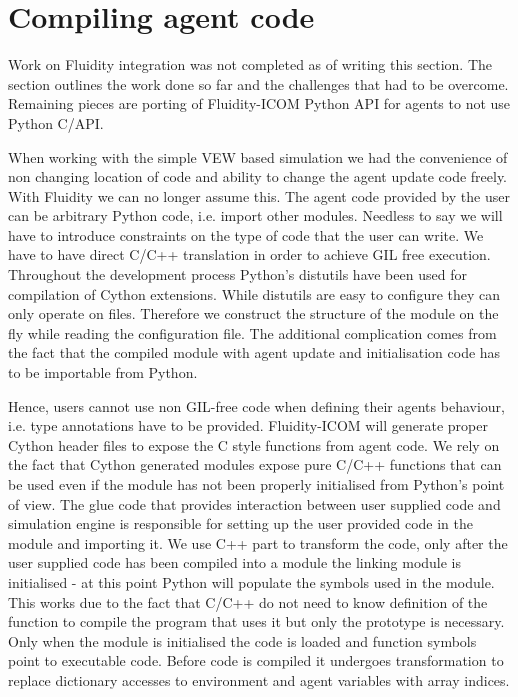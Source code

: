 \documentclass[12pt, a4paper]{report}
\begin{document}
\section{Compiling agent code}\label{sec:compl-agent-code}
Work on Fluidity integration was not completed as of writing this section. The
section outlines the work done so far and the challenges that had to
be overcome. Remaining pieces are porting of Fluidity-ICOM Python
API for agents to not use Python C/API.

When working with the simple VEW based simulation we had the convenience of
non changing location of code and ability to change the agent update code
freely. With Fluidity we can no longer assume this. The agent code provided
by the user can be arbitrary Python code, i.e. import other modules. Needless to say we will
have to introduce constraints on the type of code that the user can
write. We have to have direct C/C++ translation in order to achieve GIL
free execution. Throughout the development process Python's distutils have
been used for compilation of Cython extensions. While distutils are
easy to configure they can only operate on files. Therefore
we construct the structure of the module on the fly while reading the
configuration file. The additional complication comes from the fact
that the compiled module with agent update and initialisation code has
to be importable from Python.

Hence, users cannot use non GIL-free code when defining their agents
behaviour, i.e. type annotations have to be provided. Fluidity-ICOM
will generate proper Cython header files to expose the C
style functions from agent code. We rely on the fact that
Cython generated modules expose pure C/C++ functions that can be used
even if the module has not been properly initialised from Python's
point of view. The glue code that provides interaction between
user supplied code and simulation engine is responsible for setting
up the user provided code in the module and importing it. We use
C++ part to transform the code, only after the user
supplied code has been compiled into a module the linking module
is initialised - at this point Python will populate the symbols
used in the module. This works due to the fact that C/C++ do not
need to know definition of the function to compile the program that uses it
but only the prototype is necessary. Only when the module is
initialised the code is loaded and function symbols point to executable
code. Before code is compiled it undergoes transformation to replace
dictionary accesses to environment and agent variables with array indices.
\end{document}
